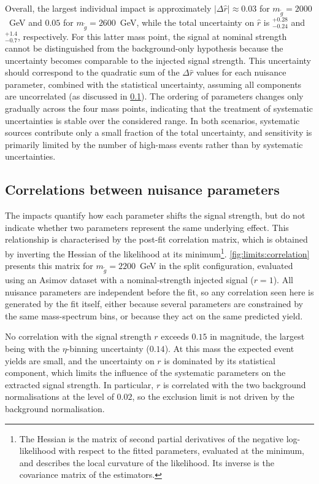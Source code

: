 Overall, the largest individual impact is approximately $|\Delta\hat{r}|\approx0.03$ for $m_{\tilde{g}}=2000$~GeV and $0.05$ for $m_{\tilde{g}}=2600$~GeV, while the total uncertainty on $\hat{r}$ is $^{+0.28}_{-0.24}$ and $^{+1.4}_{-0.7}$, respectively. For this latter mass point, the signal at nominal strength cannot be distinguished from the background-only hypothesis because the uncertainty becomes comparable to the injected signal strength. This uncertainty should correspond to the quadratic sum of the $\Delta \hat{r}$ values for each nuisance parameter, combined with the statistical uncertainty, assuming all components are uncorrelated (as discussed in \cref{sec:limits:correlations}). The ordering of parameters changes only gradually across the four mass points, indicating that the treatment of systematic uncertainties is stable over the considered range. In both scenarios, systematic sources contribute only a small fraction of the total uncertainty, and sensitivity is primarily limited by the number of high-mass events rather than by systematic uncertainties.


\subsection{Correlations between nuisance parameters}
\label{sec:limits:correlations}

The impacts quantify how each parameter shifts the signal strength, but do not indicate whether two parameters represent the same underlying effect. This relationship is characterised by the post-fit correlation matrix, which is obtained by inverting the Hessian of the likelihood at its minimum\footnote{The Hessian is the matrix of second partial derivatives of the negative log-likelihood with respect to the fitted parameters, evaluated at the minimum, and describes the local curvature of the likelihood. Its inverse is the covariance matrix of the estimators.}. \cref{fig:limits:correlation} presents this matrix for $m_{\tilde{g}}=2200$~GeV in the split configuration, evaluated using an Asimov dataset with a nominal-strength injected signal ($r=1$). All nuisance parameters are independent before the fit, so any correlation seen here is generated by the fit itself, either because several parameters are constrained by the same mass-spectrum bins, or because they act on the same predicted yield.

No correlation with the signal strength $r$ exceeds $0.15$ in magnitude, the largest being with the $\eta$-binning uncertainty ($0.14$). At this mass the expected event yields are small, and the uncertainty on $r$ is dominated by its statistical component, which limits the influence of the systematic parameters on the extracted signal strength. In particular, $r$ is correlated with the two background normalisations at the level of $0.02$, so the exclusion limit is not driven by the background normalisation.


